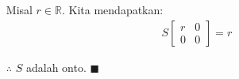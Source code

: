 \documentclass[12pt, a4paper]{scrartcl}
\begin{document}
\begin{enumerate}
\begin{enumerate}
            \begin{itemize}
                \item[] Misal $r\in \mathbb{R}$. Kita mendapatkan: 
                \begin{align*}
                    S\begin{bmatrix}
                        r&0\\0&0
                    \end{bmatrix}=r
                \end{align*}
            \end{itemize}
            \begin{itemize}
                \item[$\therefore$] $S$ adalah onto. $\blacksquare$
            \end{itemize}


\end{enumerate}
\end{enumerate}
\end{document}
